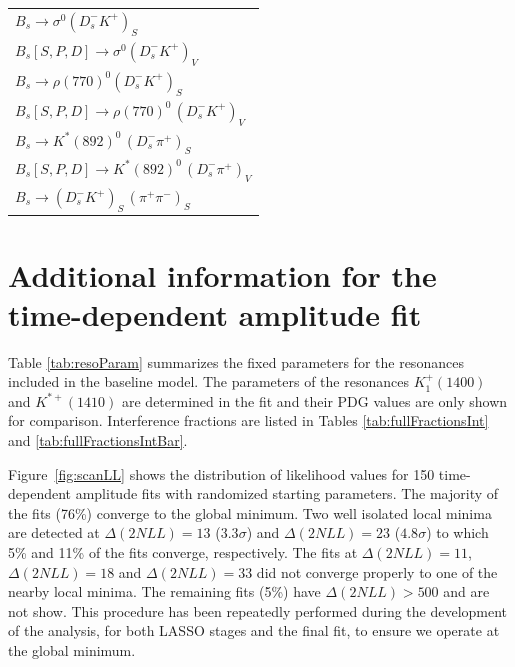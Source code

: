 \begin{table}[h]
\begin{tabular} {@{\hspace{0.5cm}}l@{\hspace{0.25cm}}}
              $B_s \to \sigma^{0} (D_s^- K^+)_S$ \\
              $B_s[S,P,D] \to \sigma^{0} (D_s^- K^+)_V$ \\
              $B_s \to \rho(770)^{0} (D_s^- K^+)_S$ \\
              $B_s[S,P,D] \to \rho(770)^{0} \, (D_s^- K^+)_V$\\
              $B_s \to  K^{*}(892)^{0} \, (D_s^- \pi^+)_S$ \\
              $B_s[S,P,D]  \to  K^{*}(892)^{0} \, (D_s^- \pi^+)_V$ \\
              $B_s \to (D_s^- K^+)_{S} \, (\pi^+ \pi^-)_{S}$ \\
              \hline \hline
           \end{tabular}
\end{table}


\clearpage


\section{Additional information for the time-dependent amplitude fit}
\label{a:ResoParas}

Table \ref{tab:resoParam} summarizes the fixed parameters for the resonances included in the baseline model.
The parameters of the resonances $K^{+}_{1}(1400)$ and $K^{*+}(1410)$ are determined in the fit 
and their PDG values are only shown for comparison.
Interference fractions are listed in Tables \ref{tab:fullFractionsInt} and \ref{tab:fullFractionsIntBar}.

Figure~\ref{fig:scanLL} shows the distribution of likelihood values 
for 150 time-dependent amplitude fits with randomized starting parameters.
The majority of the fits (76\%) converge to the global minimum.
Two well isolated local minima are detected 
at $\Delta(2NLL) = 13$ ($3.3\sigma$)
and $\Delta(2NLL) = 23$ ($4.8\sigma$)
to which 5\% and 11\%
of the fits converge, respectively.
The fits at $\Delta(2NLL) = 11$, $\Delta(2NLL) = 18$ and $\Delta(2NLL) = 33$ did not converge properly to one of the nearby local minima. 
The remaining fits (5\%) have $\Delta(2NLL) > 500$ and are not show.
This procedure has been repeatedly performed during the development of the analysis, for both LASSO stages and the final fit,
to ensure we operate at the global minimum. 



